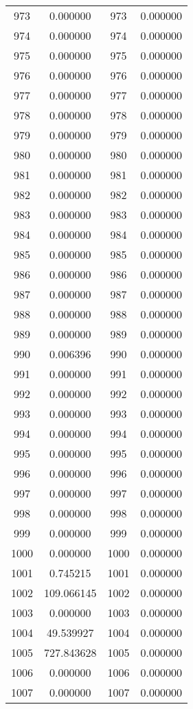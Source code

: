 \documentclass[12pt]{article}
\begin{document}
\begin{longtable}{@{}cccc@{}}
973 & 0.000000 & 973 & 0.000000 \\
974 & 0.000000 & 974 & 0.000000 \\
975 & 0.000000 & 975 & 0.000000 \\
976 & 0.000000 & 976 & 0.000000 \\
977 & 0.000000 & 977 & 0.000000 \\
978 & 0.000000 & 978 & 0.000000 \\
979 & 0.000000 & 979 & 0.000000 \\
980 & 0.000000 & 980 & 0.000000 \\
981 & 0.000000 & 981 & 0.000000 \\
982 & 0.000000 & 982 & 0.000000 \\
983 & 0.000000 & 983 & 0.000000 \\
984 & 0.000000 & 984 & 0.000000 \\
985 & 0.000000 & 985 & 0.000000 \\
986 & 0.000000 & 986 & 0.000000 \\
987 & 0.000000 & 987 & 0.000000 \\
988 & 0.000000 & 988 & 0.000000 \\
989 & 0.000000 & 989 & 0.000000 \\
990 & 0.006396 & 990 & 0.000000 \\
991 & 0.000000 & 991 & 0.000000 \\
992 & 0.000000 & 992 & 0.000000 \\
993 & 0.000000 & 993 & 0.000000 \\
994 & 0.000000 & 994 & 0.000000 \\
995 & 0.000000 & 995 & 0.000000 \\
996 & 0.000000 & 996 & 0.000000 \\
997 & 0.000000 & 997 & 0.000000 \\
998 & 0.000000 & 998 & 0.000000 \\
999 & 0.000000 & 999 & 0.000000 \\
1000 & 0.000000 & 1000 & 0.000000 \\
1001 & 0.745215 & 1001 & 0.000000 \\
1002 & 109.066145 & 1002 & 0.000000 \\
1003 & 0.000000 & 1003 & 0.000000 \\
1004 & 49.539927 & 1004 & 0.000000 \\
1005 & 727.843628 & 1005 & 0.000000 \\
1006 & 0.000000 & 1006 & 0.000000 \\
1007 & 0.000000 & 1007 & 0.000000 \\

\end{longtable}
\end{document}
